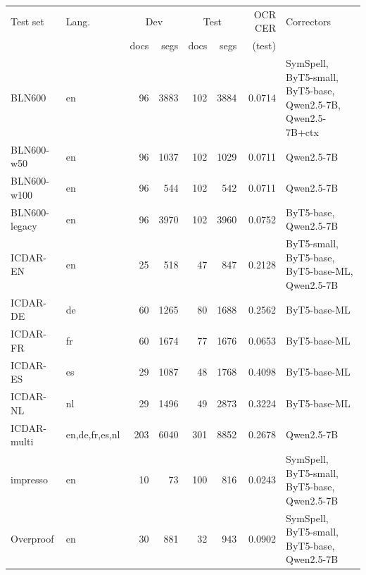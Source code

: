 \begin{tabular}{llrrrrrl}
\toprule
Test set & Lang. & \multicolumn{2}{c}{Dev} & \multicolumn{2}{c}{Test} & OCR CER & Correctors \\
 & & docs & segs & docs & segs & (test) & \\
\midrule
BLN600 & en & 96 & 3883 & 102 & 3884 & 0.0714 & SymSpell, ByT5-small, ByT5-base, Qwen2.5-7B, Qwen2.5-7B+ctx \\
BLN600-w50 & en & 96 & 1037 & 102 & 1029 & 0.0711 & Qwen2.5-7B \\
BLN600-w100 & en & 96 & 544 & 102 & 542 & 0.0711 & Qwen2.5-7B \\
BLN600-legacy & en & 96 & 3970 & 102 & 3960 & 0.0752 & ByT5-base, Qwen2.5-7B \\
ICDAR-EN & en & 25 & 518 & 47 & 847 & 0.2128 & ByT5-small, ByT5-base, ByT5-base-ML, Qwen2.5-7B \\
ICDAR-DE & de & 60 & 1265 & 80 & 1688 & 0.2562 & ByT5-base-ML \\
ICDAR-FR & fr & 60 & 1674 & 77 & 1676 & 0.0653 & ByT5-base-ML \\
ICDAR-ES & es & 29 & 1087 & 48 & 1768 & 0.4098 & ByT5-base-ML \\
ICDAR-NL & nl & 29 & 1496 & 49 & 2873 & 0.3224 & ByT5-base-ML \\
ICDAR-multi & en,de,fr,es,nl & 203 & 6040 & 301 & 8852 & 0.2678 & Qwen2.5-7B \\
impresso & en & 10 & 73 & 100 & 816 & 0.0243 & SymSpell, ByT5-small, ByT5-base, Qwen2.5-7B \\
Overproof & en & 30 & 881 & 32 & 943 & 0.0902 & SymSpell, ByT5-small, ByT5-base, Qwen2.5-7B \\
\bottomrule
\end{tabular}
